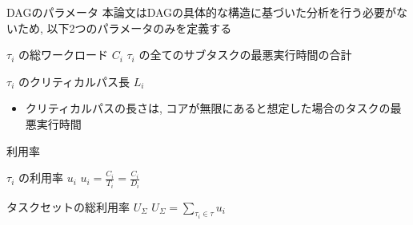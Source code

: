 \begin{frame}{DAGのパラメータ}
    本論文はDAGの具体的な構造に基づいた分析を行う必要がないため, 以下2つのパラメータのみを定義する
    \begin{block}{$\tau_{i}$ の総ワークロード $C_{i}$}
        $\tau_{i}$ の全てのサブタスクの最悪実行時間の合計
    \end{block}
    \begin{block}{$\tau_{i}$ のクリティカルパス長 $L_{i}$}
        \setlength{\linewidth}{0.98\columnwidth}
        \begin{itemize}
            \item クリティカルパスの長さは, コアが無限にあると想定した場合のタスクの最悪実行時間
        \end{itemize}
    \end{block}
\end{frame}

\begin{frame}{利用率}
    \begin{block}{$\tau_{i}$ の利用率 $u_i$}
        $u_i = \frac{C_{i}}{T_{i}}=\frac{C_{i}}{D_{i}}$
    \end{block}
    \begin{block}{タスクセットの総利用率 $U_{\Sigma}$}
        $U_{\Sigma}=\sum_{\tau_{i} \in \tau} u_{i}$
    \end{block}
\end{frame}
